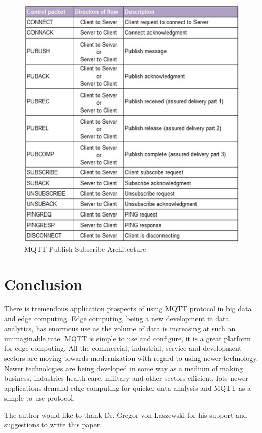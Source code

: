 \documentclass[sigconf]{acmart}
\begin{document}
\begin{figure}[htb]
\includegraphics[width=1.0\columnwidth]{images/MQTT.png}
\caption{MQTT Publish Subscribe Architecture}




\end{figure}



\section{Conclusion}
There is tremendous application prospects of using MQTT protocol in big data and edge computing. Edge computing, being a new  development in data analytics,  has enormous use as the volume of data is increasing at such an unimaginable rate. MQTT is simple to use and configure, it is a great platform for edge computing. All the commercial, industrial, service and development sectors are moving towards modernization with regard to using newer technology. Newer technologies are being developed in some way as a medium of making business, industries health care, military and other sectors efficient. Iots newer applications demand edge computing for quicker data analysis and MQTT as a simple to use protocol.  


\begin{acks}

  The author would like to thank Dr. Gregor von Laszewski for his
  support and suggestions to write this paper.

\end{acks}


 
\end{document}
